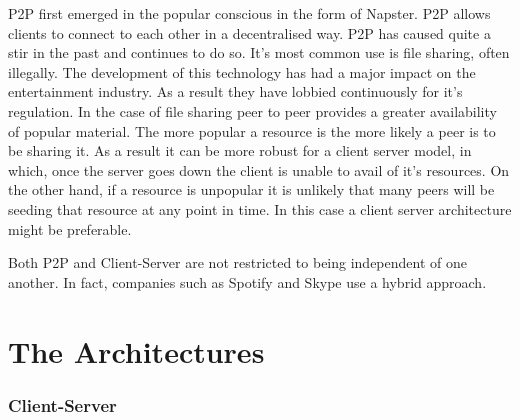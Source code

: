 \documentclass[11pt]{amsart}
\begin{document}
P2P first emerged in the popular conscious in the form of Napster. P2P allows clients to connect to each other in a decentralised way.
P2P has caused quite a stir in the past and continues to do so. It's most common use is file sharing, often illegally. The development of this technology has had a major impact on the entertainment industry. As a result they have lobbied continuously for it's regulation. 
In the case of file sharing peer to peer provides a greater availability of popular material. The more popular a resource is the more likely a peer is to be sharing it. As a result it can be more robust for a client server model, in which, once the server goes down the client is unable to avail of it's resources. On the other hand, if a resource is unpopular it is unlikely that many peers will be seeding that resource at any point in time. In this case a client server architecture might be preferable.


Both P2P and Client-Server are not restricted to being independent of one another. In fact, companies such as Spotify and Skype use a hybrid approach.

\part{The Architectures}
\section{Client-Server}
\end{document}
